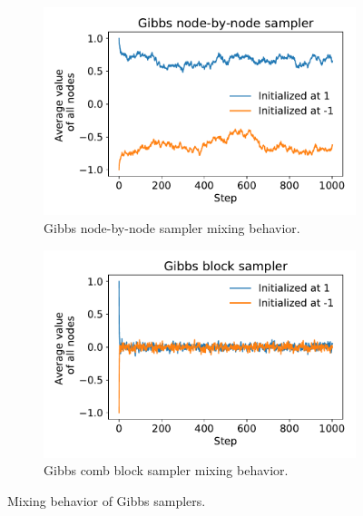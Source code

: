 \documentclass{article}
\begin{document}
\begin{figure}[h]
\centering
%
\begin{subfigure}[t]{0.48\textwidth}
\centering
\includegraphics[width=\textwidth]{./computational/gibbs_node_sampler_mixing.pdf}
\vspace{-0.6cm}
\caption{Gibbs node-by-node sampler mixing behavior.}
\end{subfigure}
%
\begin{subfigure}[t]{0.48\textwidth}
\centering
\includegraphics[width=\textwidth]{./computational/gibbs_block_sampler_mixing.pdf}
\vspace{-0.6cm}
\caption{Gibbs comb block sampler mixing behavior.}
\end{subfigure}
%
\caption{Mixing behavior of Gibbs samplers.}
\label{f:63e}
\end{figure}
\end{document}

